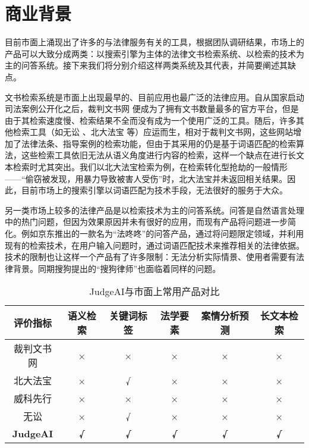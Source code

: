 \section{商业背景}

目前市面上涌现出了许多的与法律服务有关的工具，根据团队调研结果，市场上的产品可以大致分成两类：以搜索引擎为主体的法律文书检索系统、以检索的技术为主的问答系统。接下来我们将分别介绍这样两类系统及其代表，并简要阐述其缺点。

文书检索系统是市面上出现最早的、目前应用也最广泛的法律应用。自从国家启动司法案例公开化之后，裁判文书网 便成为了拥有文书数量最多的官方平台，但是由于其检索速度慢、检索结果不全而没有成为一个使用广泛的工具。随后，许多其他检索工具（如无讼 、北大法宝 等）应运而生，相对于裁判文书网，这些网站增加了法律法条、指导案例的检索功能，但由于其采用的仍是基于词语匹配的检索算法，这些检索工具依旧无法从语义角度进行内容的检索，这样一个缺点在进行长文本检索时尤其突出。我们以北大法宝检索为例，在检索转化型抢劫的一般情形——“偷窃被发现，用暴力导致被害人受伤”时，北大法宝并未返回相关结果。因此，目前市场上的搜索引擎以词语匹配为技术手段，无法很好的服务于大众。

另一类市场上较多的法律产品是以检索技术为主的问答系统。问答是自然语言处理中的热门问题，但因为效果原因并未有很好的应用，而现有产品将问题进一步简化。例如京东推出的一款名为“法咚咚”的问答产品，通过将问题限定领域，并利用现有的检索技术，在用户输入问题时，通过词语匹配技术来推荐相关的法律依据。技术的限制也让这样一个产品有了许多限制：无法分析实际情景、使用者需要有法律背景。同期搜狗提出的“搜狗律师”也面临着同样的问题。%
\begin{table}[]
\begin{tabular}{c|ccccc}
\hline
评价指标             & 语义检索       & 关键词标签      & 法学要素       & 案情分析预测     & 长文本检索      \\ \hline
裁判文书网            & ×          & ×          & ×          & ×          & ×          \\
北大法宝             & ×          & √          & ×          & ×          & ×          \\
威科先行             & ×          & ×          & ×          & ×          & ×          \\
无讼               & ×          & √          & ×          & ×          & ×          \\ \hline
\textbf{JudgeAI} & \textbf{√} & \textbf{√} & \textbf{√} & \textbf{√} & \textbf{√} \\
\hline
\end{tabular}
\caption{JudgeAI与市面上常用产品对比}
\label{background:compare}
\end{table}

